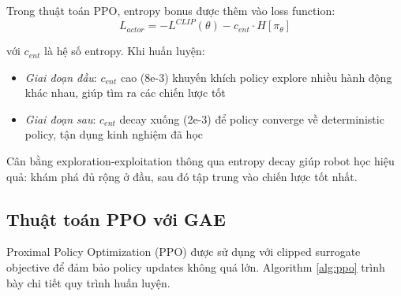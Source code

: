 Trong thuật toán PPO, entropy bonus được thêm vào loss function:
\begin{equation}
L_{actor} = -L^{CLIP}(\theta) - c_{ent} \cdot H[\pi_\theta]
\end{equation}

với $c_{ent}$ là hệ số entropy. Khi huấn luyện:
\begin{itemize}[nosep]
\item \textit{Giai đoạn đầu}: $c_{ent}$ cao (8e-3) khuyến khích policy explore nhiều hành động khác nhau, giúp tìm ra các chiến lược tốt
\item \textit{Giai đoạn sau}: $c_{ent}$ decay xuống (2e-3) để policy converge về deterministic policy, tận dụng kinh nghiệm đã học
\end{itemize}

Cân bằng exploration-exploitation thông qua entropy decay giúp robot học hiệu quả: khám phá đủ rộng ở đầu, sau đó tập trung vào chiến lược tốt nhất.

\subsection{Thuật toán PPO với GAE}

Proximal Policy Optimization (PPO) được sử dụng với clipped surrogate objective để đảm bảo policy updates không quá lớn. Algorithm \ref{alg:ppo} trình bày chi tiết quy trình huấn luyện.


